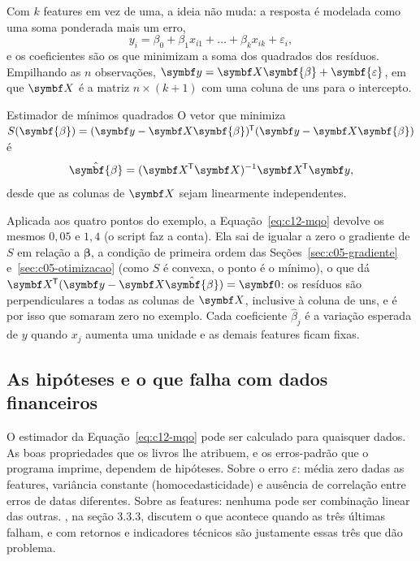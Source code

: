 Com $k$ features em vez de uma, a ideia não muda: a resposta é modelada como uma soma ponderada mais um erro,
\begin{equation}
  y_i = \beta_0 + \beta_1 x_{i1} + \dots + \beta_k x_{ik} + \varepsilon_i ,
\end{equation}
e os coeficientes são os que minimizam a soma dos quadrados dos resíduos. Empilhando as $n$ observações, $\vetor{y} = \vetor{X}\symbf{\beta} + \symbf{\varepsilon}$, em que $\vetor{X}$ é a matriz $n \times (k+1)$ com uma coluna de uns para o intercepto.

\begin{resultado}{Estimador de mínimos quadrados}
O vetor que minimiza $S(\symbf{\beta}) = (\vetor{y} - \vetor{X}\symbf{\beta})\T(\vetor{y} - \vetor{X}\symbf{\beta})$ é
\begin{equation}
  \hat{\symbf{\beta}} = (\vetor{X}\T\vetor{X})^{-1}\vetor{X}\T\vetor{y} ,
  \label{eq:c12-mqo}
\end{equation}
desde que as colunas de $\vetor{X}$ sejam linearmente independentes.
\end{resultado}

Aplicada aos quatro pontos do exemplo, a Equação~\eqref{eq:c12-mqo} devolve os mesmos $0,05$ e $1,4$ (o script  faz a conta). Ela sai de igualar a zero o gradiente de $S$ em relação a $\symbf{\beta}$, a condição de primeira ordem das Seções~\ref{sec:c05-gradiente} e~\ref{sec:c05-otimizacao} (como $S$ é convexa, o ponto é o mínimo), o que dá $\vetor{X}\T(\vetor{y} - \vetor{X}\hat{\symbf{\beta}}) = \vetor{0}$: os resíduos são perpendiculares a todas as colunas de $\vetor{X}$, inclusive à coluna de uns, e é por isso que somaram zero no exemplo. Cada coeficiente $\hat\beta_j$ é a variação esperada de $y$ quando $x_j$ aumenta uma unidade e as demais features ficam fixas.

\subsection{As hipóteses e o que falha com dados financeiros}

O estimador da Equação~\eqref{eq:c12-mqo} pode ser calculado para quaisquer dados. As boas propriedades que os livros lhe atribuem, e os erros-padrão que o programa imprime, dependem de hipóteses. Sobre o erro $\varepsilon$: média zero dadas as features, variância constante (homocedasticidade) e ausência de correlação entre erros de datas diferentes. Sobre as features: nenhuma pode ser combinação linear das outras. \citet{james2021}, na seção 3.3.3, discutem o que acontece quando as três últimas falham, e com retornos e indicadores técnicos são justamente essas três que dão problema.

